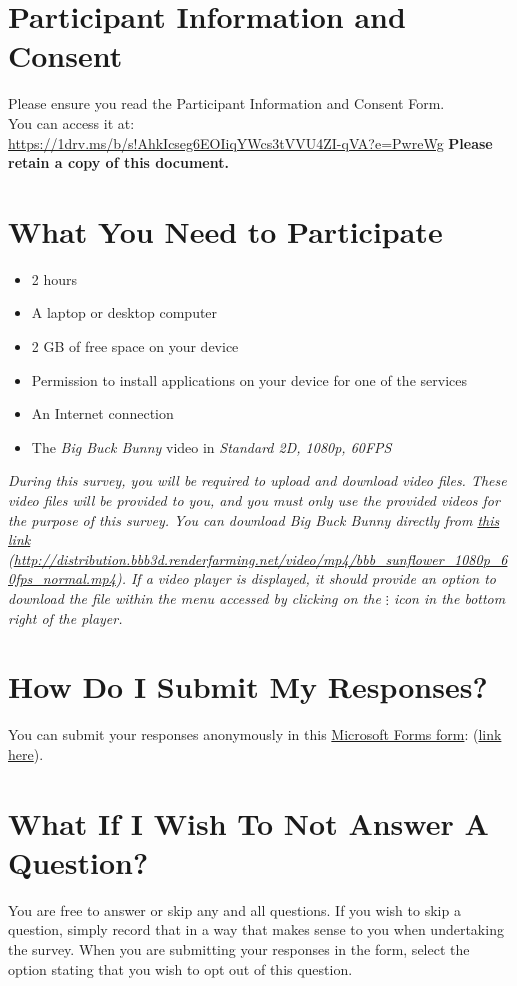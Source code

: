 \section{Participant Information and Consent}
Please ensure you read the Participant Information and Consent Form.
\\
You can access it at:
\\
\href{https://1drv.ms/b/s!AhkIcseg6EOIiqYWcs3tVVU4ZI-qVA?e=PwreWg}{\url{https://1drv.ms/b/s!AhkIcseg6EOIiqYWcs3tVVU4ZI-qVA?e=PwreWg}}
\newline
\textbf{Please retain a copy of this document.}

\section{What You Need to Participate}

\begin{itemize}
\item 2 hours
\item A laptop or desktop computer
\item 2 GB of free space on your device
\item Permission to install applications on your device for one of the services
\item An Internet connection
\item The \emph{Big Buck Bunny} video in \emph{Standard 2D, 1080p, 60FPS}
\end{itemize}

\emph{During this survey, you will be required to upload and download video files. These video files will be provided to you, and you must only use the provided videos for the purpose of this survey.
You can download Big Buck Bunny directly from \href{http://distribution.bbb3d.renderfarming.net/video/mp4/bbb_sunflower_1080p_60fps_normal.mp4}{this link} (\href{http://distribution.bbb3d.renderfarming.net/video/mp4/bbb_sunflower_1080p_60fps_normal.mp4}{\url{http://distribution.bbb3d.renderfarming.net/video/mp4/bbb_sunflower_1080p_60fps_normal.mp4}}). If a video player is displayed, it should provide an option to download the file within the menu accessed by clicking on the \textbf{$\vdots$} icon in the bottom right of the player.}

\section{How Do I Submit My Responses?}
You can submit your responses anonymously in this \href{https://forms.office.com/e/bFB5V1BRVW}{Microsoft Forms form}: (\href{https://forms.office.com/e/bFB5V1BRVW}{link here}).

\section{What If I Wish To Not Answer A Question?}
You are free to answer or skip any and all questions. If you wish to skip a question, simply record that in a way that makes sense to you when undertaking the survey. When you are submitting your responses in the form, select the option stating that you wish to opt out of this question.